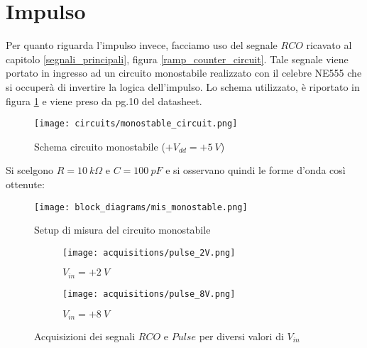 
\section{Impulso}


Per quanto riguarda l'impulso invece, facciamo uso del segnale $RCO$ ricavato al capitolo
\ref{segnali_principali}, figura \ref{ramp_counter_circuit}. Tale segnale viene portato in
ingresso ad un circuito monostabile realizzato con il celebre NE555 \cite{ne555} che si
occuperà di invertire la logica dell'impulso. Lo schema utilizzato, è riportato in figura
\ref{monostable_circuit} e viene preso da pg.10 del datasheet.

\begin{figure}[H]
    \centering
    \texttt{[image: circuits/monostable\_circuit.png]}
    \caption{Schema circuito monostabile ($+V_{dd}=+5\ V$)}
    \label{monostable_circuit}
\end{figure}

Si scelgono $R=10\ k\Omega$ e $C=100\ pF$ e si osservano quindi le forme d'onda così ottenute:

\begin{figure}[H]
    \centering
    \texttt{[image: block\_diagrams/mis\_monostable.png]}
    \caption{Setup di misura del circuito monostabile}
    \label{mis_monostable}
\end{figure}

\begin{figure}[H]
    \centering

    \begin{subfigure}{.5\textwidth}
        \centering
        \texttt{[image: acquisitions/pulse\_2V.png]}
        \caption{$V_{in}=+2\ V$}
        \label{acq_monostable_2V}
    \end{subfigure}%
    \begin{subfigure}{.5\textwidth}
        \centering
        \texttt{[image: acquisitions/pulse\_8V.png]}
        \caption{$V_{in}=+8\ V$}
        \label{acq_monostable_8V}
    \end{subfigure}

    \caption{Acquisizioni dei segnali $RCO$ e $Pulse$ per diversi valori di $V_{in}$}
    \label{mis_pulse}
\end{figure}

